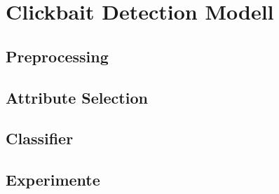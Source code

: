 \chapter{Clickbait Detection Modell} 
\label{cha:maschine_learning}

\section{Preprocessing} 
\label{sec:preprocessing}


\section{Attribute Selection} 
\label{sec:attribute_selection}


\section{Classifier} 
\label{sec:classifier}


\section{Experimente} 
\label{sec:experimentwerte}


